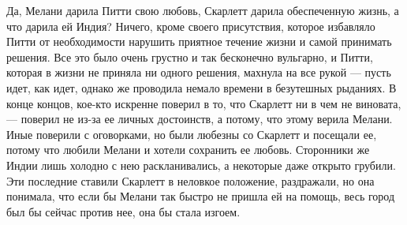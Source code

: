 Да, Мелани дарила Питти свою любовь, Скарлетт дарила обеспеченную жизнь, а что дарила ей Индия? Ничего, кроме своего присутствия, которое избавляло Питти от необходимости нарушить приятное течение жизни и самой принимать решения. Все это было очень грустно и так бесконечно вульгарно, и Питти, которая в жизни не приняла ни одного решения, махнула на все рукой — пусть идет, как идет, однако же проводила немало времени в безутешных рыданиях.
В конце концов, кое-кто искренне поверил в то, что Скарлетт ни в чем не виновата, — поверил не из-за ее личных достоинств, а потому, что этому верила Мелани. Иные поверили с оговорками, но были любезны со Скарлетт и посещали ее, потому что любили Мелани и хотели сохранить ее любовь. Сторонники же Индии лишь холодно с нею раскланивались, а некоторые даже открыто грубили. Эти последние ставили Скарлетт в неловкое положение, раздражали, но она понимала, что если бы Мелани так быстро не пришла ей на помощь, весь город был бы сейчас против нее, она бы стала изгоем.

